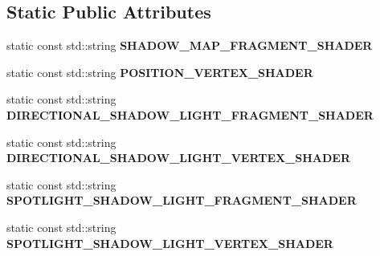 \subsection*{Static Public Attributes}
\begin{DoxyCompactItemize}
\item 
\mbox{\label{struct_geometry_engine_1_1_geometry_world_item_1_1_geometry_light_1_1_shadow_map_constants_a71f0f99aa2828df5040f38ae6e703099}} 
static const std\+::string {\bfseries S\+H\+A\+D\+O\+W\+\_\+\+M\+A\+P\+\_\+\+F\+R\+A\+G\+M\+E\+N\+T\+\_\+\+S\+H\+A\+D\+ER}
\item 
\mbox{\label{struct_geometry_engine_1_1_geometry_world_item_1_1_geometry_light_1_1_shadow_map_constants_a6497a960ea287836f98475668b9405b3}} 
static const std\+::string {\bfseries P\+O\+S\+I\+T\+I\+O\+N\+\_\+\+V\+E\+R\+T\+E\+X\+\_\+\+S\+H\+A\+D\+ER}
\item 
\mbox{\label{struct_geometry_engine_1_1_geometry_world_item_1_1_geometry_light_1_1_shadow_map_constants_a08ac0f58c281c34b95ea1d6b86408ea0}} 
static const std\+::string {\bfseries D\+I\+R\+E\+C\+T\+I\+O\+N\+A\+L\+\_\+\+S\+H\+A\+D\+O\+W\+\_\+\+L\+I\+G\+H\+T\+\_\+\+F\+R\+A\+G\+M\+E\+N\+T\+\_\+\+S\+H\+A\+D\+ER}
\item 
\mbox{\label{struct_geometry_engine_1_1_geometry_world_item_1_1_geometry_light_1_1_shadow_map_constants_a518d641248f3a14481c19684def552a6}} 
static const std\+::string {\bfseries D\+I\+R\+E\+C\+T\+I\+O\+N\+A\+L\+\_\+\+S\+H\+A\+D\+O\+W\+\_\+\+L\+I\+G\+H\+T\+\_\+\+V\+E\+R\+T\+E\+X\+\_\+\+S\+H\+A\+D\+ER}
\item 
\mbox{\label{struct_geometry_engine_1_1_geometry_world_item_1_1_geometry_light_1_1_shadow_map_constants_a1ede9618d7b64cbd9c01d273acd1c7c3}} 
static const std\+::string {\bfseries S\+P\+O\+T\+L\+I\+G\+H\+T\+\_\+\+S\+H\+A\+D\+O\+W\+\_\+\+L\+I\+G\+H\+T\+\_\+\+F\+R\+A\+G\+M\+E\+N\+T\+\_\+\+S\+H\+A\+D\+ER}
\item 
\mbox{\label{struct_geometry_engine_1_1_geometry_world_item_1_1_geometry_light_1_1_shadow_map_constants_a1bfa357a028a17d5687ba9460220a1be}} 
static const std\+::string {\bfseries S\+P\+O\+T\+L\+I\+G\+H\+T\+\_\+\+S\+H\+A\+D\+O\+W\+\_\+\+L\+I\+G\+H\+T\+\_\+\+V\+E\+R\+T\+E\+X\+\_\+\+S\+H\+A\+D\+ER}
\end{DoxyCompactItemize}


